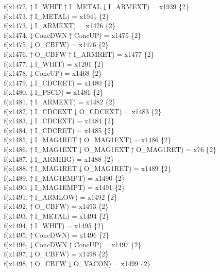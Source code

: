 f(x1472,$\uparrow$I\_WHIT$\uparrow$I\_METAL$\downarrow$I\_ARMEXT) = x1939 \{2\} \\  
f(x1473,$\uparrow$I\_METAL) = x1941 \{2\} \\  
f(x1473,$\downarrow$I\_ARMEXT) = x1426 \{2\} \\  
f(x1474,$\downarrow$ConcDWN$\uparrow$ConcUP) = x1475 \{2\} \\  
f(x1475,$\downarrow$O\_CBFW) = x1476 \{2\} \\  
f(x1476,$\uparrow$O\_CBFW$\uparrow$I\_ARMRET) = x1477 \{2\} \\  
f(x1477,$\downarrow$I\_WHIT) = x1201 \{2\} \\  
f(x1478,$\downarrow$ConcUP) = x1468 \{2\} \\  
f(x1479,$\downarrow$I\_CDCRET) = x1480 \{2\} \\  
f(x1480,$\downarrow$I\_PSCD) = x1481 \{2\} \\  
f(x1481,$\uparrow$I\_ARMEXT) = x1482 \{2\} \\  
f(x1482,$\uparrow$I\_CDCEXT$\downarrow$O\_CDCEXT) = x1483 \{2\} \\  
f(x1483,$\downarrow$I\_CDCEXT) = x1484 \{2\} \\  
f(x1484,$\uparrow$I\_CDCRET) = x1485 \{2\} \\  
f(x1485,$\downarrow$I\_MAG1RET$\uparrow$O\_MAG1EXT) = x1486 \{2\} \\  
f(x1486,$\uparrow$I\_MAG1EXT$\downarrow$O\_MAG1EXT$\uparrow$O\_MAG1RET) = x76 \{2\} \\  
f(x1487,$\downarrow$I\_ARMHIG) = x1488 \{2\} \\  
f(x1488,$\uparrow$I\_MAG1RET$\downarrow$O\_MAG1RET) = x1489 \{2\} \\  
f(x1489,$\uparrow$I\_MAG1EMPT) = x1490 \{2\} \\  
f(x1490,$\downarrow$I\_MAG1EMPT) = x1491 \{2\} \\  
f(x1491,$\uparrow$I\_ARMLOW) = x1492 \{2\} \\  
f(x1492,$\uparrow$O\_CBFW) = x1493 \{2\} \\  
f(x1493,$\uparrow$I\_METAL) = x1494 \{2\} \\  
f(x1494,$\uparrow$I\_WHIT) = x1495 \{2\} \\  
f(x1495,$\uparrow$ConcDWN) = x1496 \{2\} \\  
f(x1496,$\downarrow$ConcDWN$\uparrow$ConcUP) = x1497 \{2\} \\  
f(x1497,$\downarrow$O\_CBFW) = x1498 \{2\} \\  
f(x1498,$\uparrow$O\_CBFW$\downarrow$O\_VACON) = x1499 \{2\} \\  
